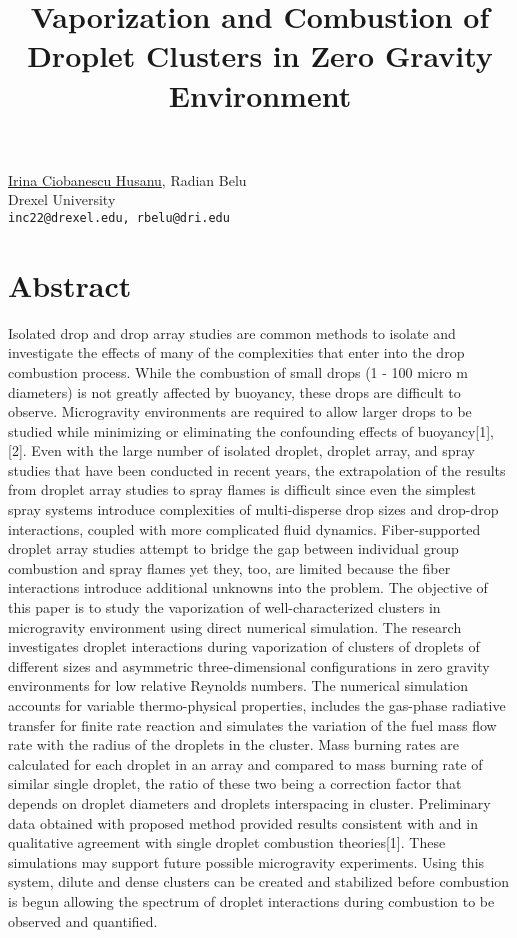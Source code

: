 \title{Vaporization and Combustion of Droplet Clusters in Zero Gravity Environment}
\author{} \institute{}
\maketitle

\begin{center}
{\large \underline{Irina Ciobanescu Husanu}, Radian Belu}\\
Drexel University\\
{\tt inc22@drexel.edu, rbelu@dri.edu}
\end{center}

\section*{Abstract}
Isolated drop and drop array studies are common methods to isolate and investigate the effects of many of the complexities that enter into the drop combustion process. While the combustion of small drops (1 - 100 micro m diameters) is not greatly affected by buoyancy, these drops are difficult to observe. Microgravity environments are required to allow larger drops to be studied while minimizing or eliminating the confounding effects of buoyancy[1],[2]. Even with the large number of isolated droplet, droplet array, and spray studies that have been conducted in recent years, the extrapolation of the results from droplet array studies to spray flames is difficult since even the simplest spray systems introduce complexities of multi-disperse drop sizes and drop-drop interactions, coupled with more complicated fluid dynamics. Fiber-supported droplet array studies attempt to bridge the gap between individual group combustion and spray flames yet they, too, are limited because the fiber interactions introduce additional unknowns into the problem. The objective of this paper is to study the vaporization of well-characterized clusters in microgravity environment using direct numerical simulation. The research investigates droplet interactions during vaporization of clusters of droplets of different sizes and asymmetric three-dimensional configurations in zero gravity environments for low relative Reynolds numbers. The numerical simulation accounts for variable thermo-physical properties, includes the gas-phase radiative transfer for finite rate reaction and simulates the variation of the fuel mass flow rate with the radius of the droplets in the cluster. Mass burning rates are calculated for each droplet in an array and compared to mass burning rate of similar single droplet, the ratio of these two being a correction factor that depends on droplet diameters and droplets interspacing in cluster. Preliminary data obtained with proposed method provided results consistent with and in qualitative agreement with single droplet combustion theories[1]. These simulations may support future possible microgravity experiments. Using this system, dilute and dense clusters can be created and stabilized before combustion is begun allowing the spectrum of droplet interactions during combustion to be observed and quantified.

